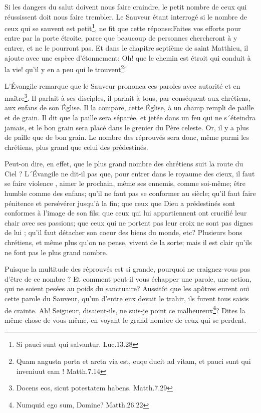 \documentclass[instructions.tex]{subfiles}
\begin{document}
\secundo Si les dangers du salut doivent nous faire craindre, le petit nombre de ceux qui réussissent doit nous faire trembler. Le Sauveur étant interrogé si le nombre de ceux qui se sauvent est petit\footnote{Si pauci sunt qui salvantur. Luc.13.28}, ne fit que cette réponse:\og Faites vos efforts pour entre par la porte étroite, parce que beaucoup de personnes chercheront à y entrer, et ne le pourront pas\fg. Et dans le chapitre septième de saint Matthieu, il ajoute avec une espèce d'étonnement: Oh! que le chemin est étroit qui conduit à la vie! qu'il y en a peu qui le trouvent\footnote{Quam angusta porta et arcta via est, euqe ducit ad vitam, et pauci sunt qui inveniuut eam ! Matth.7.14}!

L'Évangile remarque que le Sauveur prononca ces paroles avec autorité et en maître\footnote{Docens eos, sicut potestatem habens. Matth.7.29}. Il parlait à ses disciples, il parlait à tous, par conséquent aux chrétiens, aux enfans de son Église. Il la compare, cette Église, à un champ rempli de paille et de grain. Il dit que la paille sera séparée, et jetée dans un feu qui ne s´éteindra jamais, et le bon grain sera placé dans le grenier du Père celeste. Or, il y a plus de paille que de bon grain. Le nombre des réprouvés sera donc, même parmi les chrétiens, plus grand que celui des prédestinés.

Peut-on dire, en effet, que le plus grand nombre des chrétiens suit la route du Ciel ? L´Évangile ne dit-il pas que, pour entrer dans le royaume des cieux, il faut se faire violence , aimer le prochain, même ses ennemis, comme soi-même; être humble comme des enfans; qu'il ne faut pas se conformer au siècle; qu'il faut faire pénitence et persévérer jusqu'à la fin; que ceux que Dieu a prédestinés sont conformes à l'image de son fils; que ceux qui lui appartiennent ont crucifié leur chair avec ses passions; que ceux qui ne portent pas leur croix ne sont pas dignes de lui ; qu'il faut détacher son coeur des biens du monde, etc? Plusieurs bons chrétiens, et même plus qu'on ne pense, vivent de la sorte; mais il est clair qu'ils ne font pas le plus grand nombre.

\tertio Puisque la multitude des réprouvés est si grande, pourquoi ne craignez-vous pas d'être de ce nombre ? Et comment peut-il vous échapper une parole, une action, qui ne soient pesées au poids du sanctuaire? Aussitôt que les apôtres eurent ouï cette parole du Sauveur, qu'un d'entre eux devait le trahir, ils furent tous saisis de crainte. Ah! Seigneur, disaient-ils, ne suis-je point ce malheureux\footnote{Numquid ego sum, Domine? Matth.26.22}? Dites la même chose de vous-même, en voyant le grand nombre de ceux qui se perdent.
\end{document}
